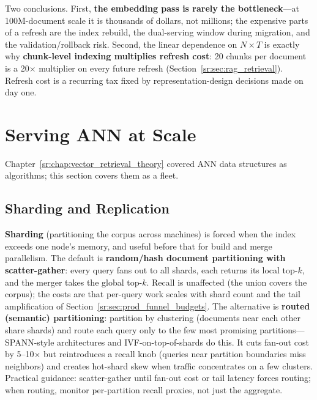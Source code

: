 Two conclusions. First, \textbf{the embedding pass is rarely the bottleneck}---at 100M-document scale it is thousands of dollars, not millions; the expensive parts of a refresh are the index rebuild, the dual-serving window during migration, and the validation/rollback risk. Second, the linear dependence on $N \times T$ is exactly why \textbf{chunk-level indexing multiplies refresh cost}: 20 chunks per document is a 20$\times$ multiplier on every future refresh (Section~\ref{sr:sec:rag_retrieval}). Refresh cost is a recurring tax fixed by representation-design decisions made on day one.

\section{Serving ANN at Scale}
\label{sr:sec:ann_serving}

Chapter~\ref{sr:chap:vector_retrieval_theory} covered ANN data structures as algorithms; this section covers them as a fleet.

\subsection{Sharding and Replication}

\textbf{Sharding} (partitioning the corpus across machines) is forced when the index exceeds one node's memory, and useful before that for build and merge parallelism. The default is \textbf{random/hash document partitioning with scatter-gather}: every query fans out to all shards, each returns its local top-$k$, and the merger takes the global top-$k$. Recall is unaffected (the union covers the corpus); the costs are that per-query work scales with shard count and the tail amplification of Section~\ref{sr:sec:prod_funnel_budgets}. The alternative is \textbf{routed (semantic) partitioning}: partition by clustering (documents near each other share shards) and route each query only to the few most promising partitions---SPANN-style architectures and IVF-on-top-of-shards do this. It cuts fan-out cost by 5--10$\times$ but reintroduces a recall knob (queries near partition boundaries miss neighbors) and creates hot-shard skew when traffic concentrates on a few clusters. Practical guidance: scatter-gather until fan-out cost or tail latency forces routing; when routing, monitor per-partition recall proxies, not just the aggregate.

